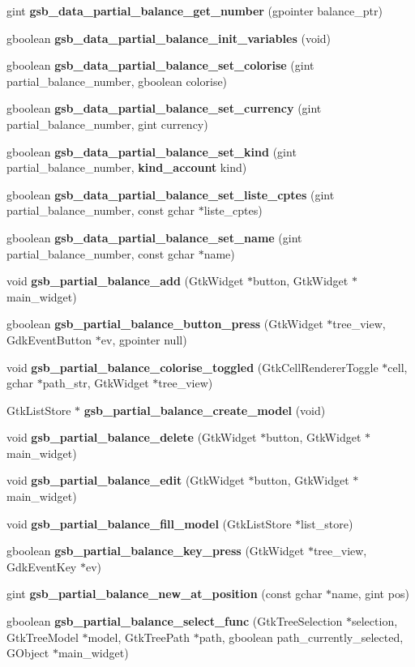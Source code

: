 \begin{DoxyCompactItemize}
\item 
gint {\bf gsb\_\-data\_\-partial\_\-balance\_\-get\_\-number} (gpointer balance\_\-ptr)
\item 
gboolean {\bf gsb\_\-data\_\-partial\_\-balance\_\-init\_\-variables} (void)
\item 
gboolean {\bf gsb\_\-data\_\-partial\_\-balance\_\-set\_\-colorise} (gint partial\_\-balance\_\-number, gboolean colorise)
\item 
gboolean {\bf gsb\_\-data\_\-partial\_\-balance\_\-set\_\-currency} (gint partial\_\-balance\_\-number, gint currency)
\item 
gboolean {\bf gsb\_\-data\_\-partial\_\-balance\_\-set\_\-kind} (gint partial\_\-balance\_\-number, {\bf kind\_\-account} kind)
\item 
gboolean {\bf gsb\_\-data\_\-partial\_\-balance\_\-set\_\-liste\_\-cptes} (gint partial\_\-balance\_\-number, const gchar $\ast$liste\_\-cptes)
\item 
gboolean {\bf gsb\_\-data\_\-partial\_\-balance\_\-set\_\-name} (gint partial\_\-balance\_\-number, const gchar $\ast$name)
\item 
void {\bf gsb\_\-partial\_\-balance\_\-add} (GtkWidget $\ast$button, GtkWidget $\ast$main\_\-widget)
\item 
gboolean {\bf gsb\_\-partial\_\-balance\_\-button\_\-press} (GtkWidget $\ast$tree\_\-view, GdkEventButton $\ast$ev, gpointer null)
\item 
void {\bf gsb\_\-partial\_\-balance\_\-colorise\_\-toggled} (GtkCellRendererToggle $\ast$cell, gchar $\ast$path\_\-str, GtkWidget $\ast$tree\_\-view)
\item 
GtkListStore $\ast$ {\bf gsb\_\-partial\_\-balance\_\-create\_\-model} (void)
\item 
void {\bf gsb\_\-partial\_\-balance\_\-delete} (GtkWidget $\ast$button, GtkWidget $\ast$main\_\-widget)
\item 
void {\bf gsb\_\-partial\_\-balance\_\-edit} (GtkWidget $\ast$button, GtkWidget $\ast$main\_\-widget)
\item 
void {\bf gsb\_\-partial\_\-balance\_\-fill\_\-model} (GtkListStore $\ast$list\_\-store)
\item 
gboolean {\bf gsb\_\-partial\_\-balance\_\-key\_\-press} (GtkWidget $\ast$tree\_\-view, GdkEventKey $\ast$ev)
\item 
gint {\bf gsb\_\-partial\_\-balance\_\-new\_\-at\_\-position} (const gchar $\ast$name, gint pos)
\item 
gboolean {\bf gsb\_\-partial\_\-balance\_\-select\_\-func} (GtkTreeSelection $\ast$selection, GtkTreeModel $\ast$model, GtkTreePath $\ast$path, gboolean path\_\-currently\_\-selected, GObject $\ast$main\_\-widget)
\end{DoxyCompactItemize}


